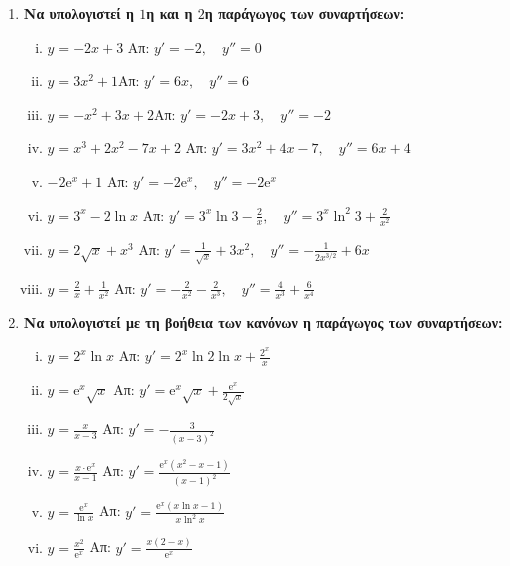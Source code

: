 \documentclass[a4paper,table]{report}
\begin{document}
\begin{center}
  \minibox{\bfseries\large \textcolor{Col1}{Ασκήσεις στις Παραγώγους}}
\end{center}

\vspace{\baselineskip}


\begin{enumerate}
  \item {\bfseries Να υπολογιστεί η $1$η και η $2$η παράγωγος των συναρτήσεων:}
    \begin{enumerate}[i)]
      \item $ y=-2x+3 $ \hfill Απ: $ y'=-2,\quad y''=0 $ 
      \item $y=3x^2+1$\hfill Απ: $y'=6x,\quad y''=6$
      \item $y=-x^2+3x+2$\hfill Απ: $y'=-2x+3,\quad y''=-2$
      \item $ y=x^{3}+2x^{2}-7x+2 $ \hfill Απ: $ y'=3x^{2}+4x-7, \quad y''=6x+4$ 
      \item $ -2\mathrm{e}^{x} + 1 $ \hfill Απ: $ y'=-2 \mathrm{e}^{x} , 
        \quad y''=-2 \mathrm{e}^{x} $
      \item $ y = 3^{x} - 2\ln{x} $ 
        \hfill Απ: $ y' = 3^{x}\ln{3} - \frac{2}{x}, 
        \quad y'' = 3^{x}\ln^{2}3 + \frac{2}{x^{2}}  $
      \item $ y= 2\sqrt{ x } + x^{3} $ 
        \hfill Απ: $ y'= \frac{1}{\sqrt{ x }} + 3x^{2}, \quad y''=
        - \frac{1}{2 x^{3/2}} + 6x $
      \item $y= \frac{2}{x} + \frac{1}{x^{2}} $
        \hfill Απ: $y'=-\frac{2}{x^2} - \frac{2}{x^3},
        \quad y''= \frac{4}{x^3}+\frac{6}{x^4}$
    \end{enumerate}

  \item {\bfseries Να υπολογιστεί με τη βοήθεια των κανόνων η παράγωγος των συναρτήσεων:}
    \begin{enumerate}[i)]
      \item $ y= 2^{x} \ln{x} $ 
        \hfill Απ: $ y' = 2^{x} \ln{2} \ln{x} + \frac{2^{x}}{x}$ 
      \item $ y= \mathrm{e}^{x} \sqrt{x} $ 
        \hfill Απ: $ y'= \mathrm{e}^{x} \sqrt{x} + \frac{\mathrm{e}^{x}}{2 \sqrt{x}}$ 
      \item $ y= \frac{x}{x-3} $ \hfill Απ: $ y'= - \frac{3}{(x-3)^{2}} $  
      \item $ y = \frac{x\cdot \mathrm{e}^{x}}{x-1} $ 
        \hfill Απ: $ y' = \frac{\mathrm{e}^{x} (x^{2}-x-1)}{(x-1)^{2}} $ 
      \item $ y= \frac{\mathrm{e}^{x}}{\ln{x}} $ \hfill Απ: $ y'=
        \frac{\mathrm{e}^{x} (x \ln{x} -1)}{x \ln^{2}{x}} $ 
      \item $ y= \frac{x^{2}}{\mathrm{e}^{x}} $ 
        \hfill Απ: $ y' = \frac{x(2-x)}{\mathrm{e}^{x}} $ 
    \end{enumerate}


\end{enumerate}
\end{document}
